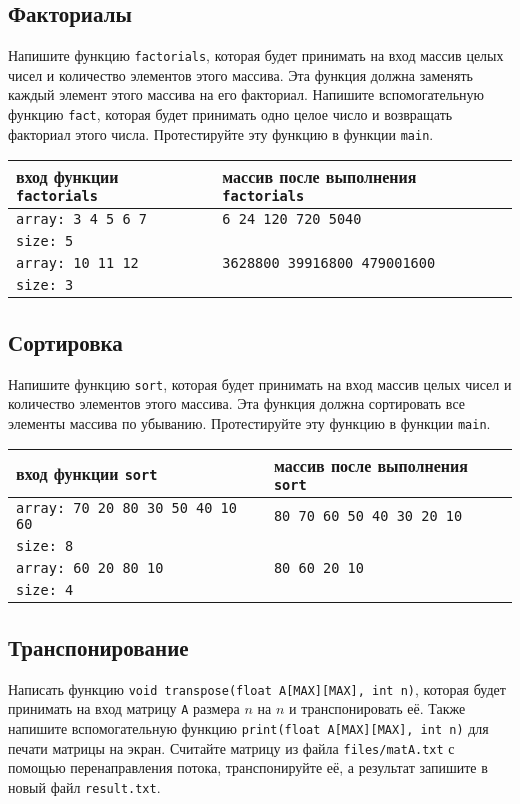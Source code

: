 \documentclass[10pt]{article}
\begin{document}
\subsection{Факториалы}
Напишите функцию \texttt{factorials}, которая будет принимать на вход массив целых чисел и количество элементов этого массива. Эта функция должна заменять каждый элемент этого массива на его факториал. Напишите вспомогательную функцию \texttt{fact}, которая будет принимать одно целое число и возвращать факториал этого числа. Протестируйте эту функцию в функции \texttt{main}.
\begin{center}
\begin{tabular}{ l | l }
 вход функции \texttt{factorials} & массив после выполнения \texttt{factorials} \\ \hline
 \texttt{array: 3 4 5 6 7} & \texttt{6 24 120 720 5040} \\
 \texttt{size: 5} & \\ \hline
 \texttt{array: 10 11 12} & \texttt{3628800 39916800 479001600} \\
 \texttt{size: 3} & \\
\end{tabular}
\end{center} 

\subsection{Сортировка}
Напишите функцию \texttt{sort}, которая будет принимать на вход массив целых чисел и количество элементов этого массива. Эта функция должна сортировать все элементы массива по убыванию. Протестируйте эту функцию в функции \texttt{main}.
\begin{center}
\begin{tabular}{ l | l }
 вход функции \texttt{sort} & массив после выполнения \texttt{sort} \\ \hline
 \texttt{array: 70 20 80 30 50 40 10 60} & \texttt{80 70 60 50 40 30 20 10} \\
 \texttt{size: 8} & \\ \hline
 \texttt{array: 60 20 80 10} & \texttt{80 60 20 10} \\
 \texttt{size: 4} & \\
\end{tabular}
\end{center} 


\subsection{Транспонирование}
Написать функцию \texttt{void transpose(float A[MAX][MAX], int n)}, которая будет принимать на вход матрицу \texttt{A} размера $n$ на $n$ и транспонировать её. Также напишите вспомогательную функцию \texttt{print(float A[MAX][MAX], int n)} для печати матрицы на экран. Считайте матрицу из файла \texttt{files/matA.txt} с помощью перенаправления потока, транспонируйте её, а результат запишите в новый файл \texttt{result.txt}.\\
\end{document}

